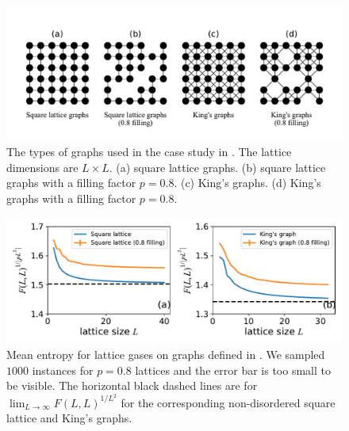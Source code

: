 \documentclass[review, onefignum, onetabnum]{siamart190516}
\begin{document}
\begin{figure}[t] 
    \centering
    \includegraphics[width=\textwidth, trim={0cm 1cm 0cm 1cm}, clip]{figures/lattices.pdf}
    \caption{The types of graphs used in the case study in .
    The lattice dimensions are $L\times L$. (a) square lattice graphs. (b) square lattice graphs with a filling factor $p=0.8$.
    (c) King's graphs. (d) King's graphs with a filling factor $p=0.8$.}
    \label{fig:lattices}
\end{figure}

\begin{figure}[t] 
    \centering
    \includegraphics[width=\textwidth, trim={0cm 0cm 0cm 0cm}, clip]{figures/fig5.pdf}
    \caption{Mean entropy for lattice gases on graphs defined in .
    We sampled $1000$ instances for $p=0.8$ lattices and the error bar is too small to be visible.
    The horizontal black dashed lines are for $\lim_{L\rightarrow \infty} F(L,L)^{1/L^2}$ for the corresponding non-disordered square lattice and King's graphs.
    }
    \label{fig:hardsquare}
\end{figure}
\end{document}
